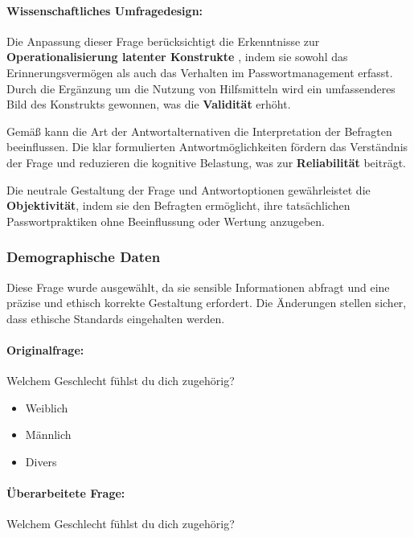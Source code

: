 \documentclass[german,report]{i1thesis}
\begin{document}
\paragraph{Wissenschaftliches Umfragedesign:}

Die Anpassung dieser Frage berücksichtigt die Erkenntnisse zur \textbf{Operationalisierung latenter Konstrukte} \cite{Tausendpfund2018}, indem sie sowohl das Erinnerungsvermögen als auch das Verhalten im Passwortmanagement erfasst. Durch die Ergänzung um die Nutzung von Hilfsmitteln wird ein umfassenderes Bild des Konstrukts gewonnen, was die \textbf{Validität} erhöht.

Gemäß \citet{LucasBaird2006} kann die Art der Antwortalternativen die Interpretation der Befragten beeinflussen. Die klar formulierten Antwortmöglichkeiten fördern das Verständnis der Frage und reduzieren die kognitive Belastung, was zur \textbf{Reliabilität} beiträgt.

Die neutrale Gestaltung der Frage und Antwortoptionen gewährleistet die \textbf{Objektivität}, indem sie den Befragten ermöglicht, ihre tatsächlichen Passwortpraktiken ohne Beeinflussung oder Wertung anzugeben.

\subsubsection{Demographische Daten}

Diese Frage wurde ausgewählt, da sie sensible Informationen abfragt und eine präzise und ethisch korrekte Gestaltung erfordert. Die Änderungen stellen sicher, dass ethische Standards eingehalten werden.

\paragraph{Originalfrage:}

Welchem Geschlecht fühlst du dich zugehörig?

\begin{itemize}
    \item Weiblich
    \item Männlich
    \item Divers
\end{itemize}

\paragraph{Überarbeitete Frage:}

Welchem Geschlecht fühlst du dich zugehörig?
\end{document}
